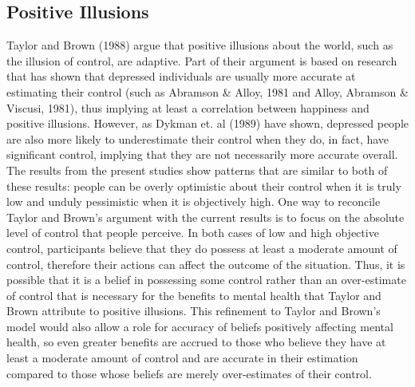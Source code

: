 \documentclass[USenglish,letterpaper,12pt,extrafontsizes,oneside,onecolumn,final]{memoir}
\begin{document}
\subsection{Positive Illusions}
Taylor and Brown (1988) argue that positive illusions about the world, such as the illusion of control, are adaptive. Part of their argument is based on research that has shown that depressed individuals are usually more accurate at estimating their control (such as Abramson \& Alloy, 1981 and Alloy, Abramson \& Viscusi, 1981), thus implying at least a correlation between happiness and positive illusions.  However, as Dykman et. al (1989) have shown, depressed people are also more likely to underestimate their control when they do, in fact, have significant control, implying that they are not necessarily more accurate overall. The results from the present studies show patterns that are similar to both of these results: people can be overly optimistic about their control when it is truly low and unduly pessimistic when it is objectively high. One way to reconcile Taylor and Brown's argument with the current results is to focus on the absolute level of control that people perceive.  In both cases of low and high objective control, participants believe that they do possess at least a moderate amount of control, therefore their actions can affect the outcome of the situation.  Thus, it is possible that it is a belief in possessing some control rather than an over-estimate of control that is necessary for the benefits to mental health that Taylor and Brown attribute to positive illusions. This refinement to Taylor and Brown's model would also allow a role for accuracy of beliefs positively affecting mental health, so even greater benefits are accrued to those who believe they have at least a moderate amount of control and are accurate in their estimation compared to those whose beliefs are merely over-estimates of their control.  
\end{document}
